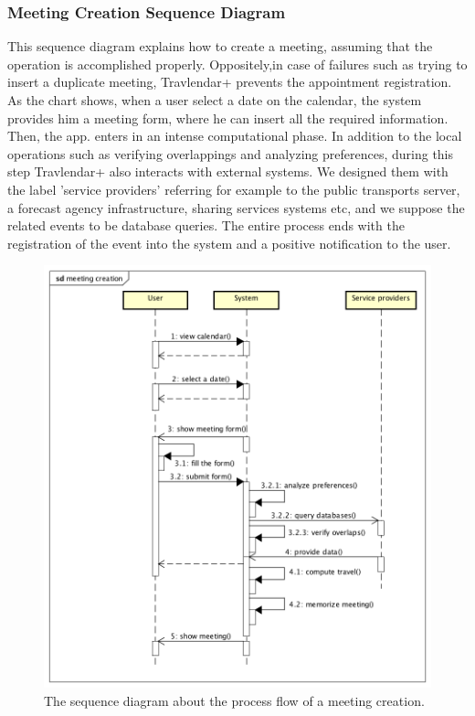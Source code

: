 \subsubsection{Meeting Creation Sequence Diagram}

This sequence diagram explains how to create a meeting, assuming that the operation is accomplished properly.
Oppositely,in case of failures such as trying to insert a duplicate meeting, Travlendar+ prevents the appointment registration. 
As the chart shows, when a user select a date on the calendar, the system provides him a meeting form, where he can insert all the required information. Then, the app. enters in an intense computational phase. In addition to the local operations such as verifying overlappings and analyzing preferences, during this step Travlendar+ also interacts with external systems. 
We designed them with the label 'service providers' referring for example to the public transports server, a forecast agency infrastructure, sharing services systems etc, and we suppose the related events to be database queries. 
The entire process ends with the registration of the event into the system and a positive notification to the user. 

\begin{figure}[htp]
	
	\centering
	\includegraphics[width=\textwidth]{sequencediagrams/meetingcreation}
	\caption{The sequence diagram about the process flow of a meeting creation.}
	\label{fig:meetingcreation}
		
\end{figure}
\newpage

